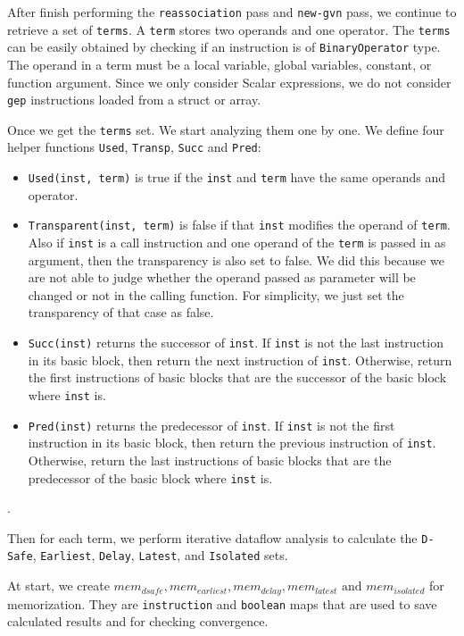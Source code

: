 \documentclass[onecolumn,10pt]{journal}
\begin{document}
After finish performing the \texttt{reassociation} pass and \texttt{new-gvn} pass, we continue to retrieve a set of \texttt{terms}. A \texttt{term} stores two operands and one operator. The \texttt{terms} can be easily obtained by checking if an instruction is of \texttt{BinaryOperator} type. The operand in a term must be a local variable, global variables, constant, or function argument. Since we only consider Scalar expressions, we do not consider \texttt{gep} instructions loaded from a struct or array. 

Once we get the \texttt{terms} set. We start analyzing them one by one. We define four helper functions \texttt{Used}, \texttt{Transp}, \texttt{Succ} and \texttt{Pred}:
\begin{itemize}
\item \texttt{Used(inst, term)} is true if the \texttt{inst} and \texttt{term} have the same operands and operator.
\item  \texttt{Transparent(inst, term)} is false if that \texttt{inst} modifies the operand of \texttt{term}. Also if \texttt{inst} is a call instruction and one operand of the \texttt{term} is passed in as argument, then the transparency is also set to false. We did this because we are not able to judge whether the operand passed as parameter will be changed or not in the calling function. For simplicity, we just set the transparency of that case as false.
\item \texttt{Succ(inst)} returns the successor of \texttt{inst}. If \texttt{inst} is not the last instruction in its basic block, then return the next instruction of \texttt{inst}. Otherwise, return the first instructions of basic blocks that are the successor of the basic block where \texttt{inst} is.   
\item \texttt{Pred(inst)} returns the predecessor of \texttt{inst}. If \texttt{inst} is not the first instruction in its basic block, then return the previous instruction of \texttt{inst}. Otherwise, return the last instructions of basic blocks that are the predecessor of the basic block where \texttt{inst} is.
\end{itemize}.

Then for each term, we perform iterative dataflow analysis to calculate the \texttt{D-Safe}, \texttt{Earliest}, \texttt{Delay}, \texttt{Latest}, and \texttt{Isolated} sets. 

At start, we create $mem_{dsafe}, mem_{earliest}, mem_{delay}, mem_{latest}\text{ and } mem_{isolated}$ for memorization. They are \texttt{instruction} and \texttt{boolean} maps that are used to save calculated results and for checking convergence.  
\end{document}
